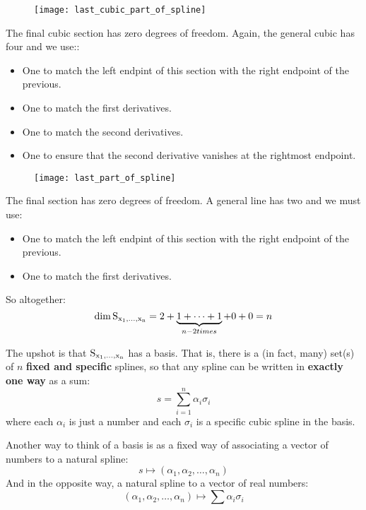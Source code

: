 \begin{frame}
	\begin{figure}
    \texttt{[image: last\_cubic\_part\_of\_spline]}
	\end{figure}
  The final cubic section has zero degrees of freedom.  Again, the general cubic has four and we use::
  \begin{itemize}
    \item One to match the left endpint of this section with the right endpoint of the previous.
    \item One to match the first derivatives.
    \item One to match the second derivatives.
    \item One to ensure that the second derivative vanishes at the rightmost endpoint.
  \end{itemize}
\end{frame}
%
%
\begin{frame}
	\begin{figure}
    \texttt{[image: last\_part\_of\_spline]}
	\end{figure}
  The final section has zero degrees of freedom.  A general line has two and we must use:
  \begin{itemize}
    \item One to match the left endpint of this section with the right endpoint of the previous.
    \item One to match the first derivatives.
  \end{itemize}
\end{frame}
%
%
\begin{frame}
  So altogether:
  $$ \dim \operatorname*{S_{x_1, \ldots, x_n}} = 2 + \underbrace{1 + \cdots + 1}_{n-2 times} + 0 + 0 = n $$
\end{frame}
%
%
\begin{frame}
  The upshot is that $\operatorname*{S_{x_1, \ldots, x_n}}$ has a basis.  That is, there is a (in fact, many) set(s) of $n$ \textbf{fixed and specific} splines, so that any spline can be written in \textbf{exactly one way} as a sum:
  $$ s = \sum_{i=1}^n \alpha_i \sigma_i $$
where each $\alpha_i$ is just a number and each $\sigma_i$ is a specific cubic spline in the basis.
\end{frame}
%
%
\begin{frame}
  Another way to think of a basis is as a fixed way of associating a vector of numbers to a natural spline:
  $$ s \mapsto (\alpha_1, \alpha_2, \ldots, \alpha_n) $$
And in the opposite way, a natural spline to a vector of real numbers:
  $$ (\alpha_1, \alpha_2, \ldots, \alpha_n) \mapsto \sum \alpha_i \sigma_i $$
\end{frame}
